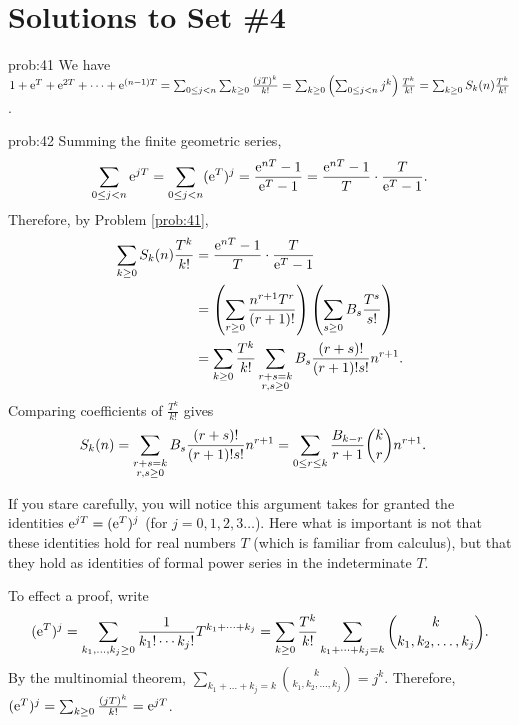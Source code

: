 
\chapter*{Solutions to Set \#4}
\label{set3sols}


\begin{sol}{prob:41} We have $1+\mathrm{e}^{T} + \mathrm{e}^{2T} + \dots + \mathrm{e}^{(n-1)T} = \sum_{0 \le j < n} \sum_{k\ge 0} \frac{(jT)^{k}}{k!} 
=\sum_{k\ge 0} \left(\sum_{0 \le j < n} j^k\right) \frac{T^k}{k!} = \sum_{k\ge 0} S_k(n) \frac{T^k}{k!}$.
\end{sol}

\begin{sol}{prob:42} Summing the finite geometric series,
\[ \sum_{0 \le j < n} \mathrm{e}^{jT} = \sum_{0 \le j < n} (\mathrm{e}^{T})^{j} = \frac{\mathrm{e}^{nT}-1}{\mathrm{e}^{T}-1} = \frac{\mathrm{e}^{nT}-1}{T} \cdot \frac{T}{\mathrm{e}^{T}-1}.\]
Therefore, by Problem \ref{prob:41},
\begin{align*} \sum_{k \ge 0} S_k(n) \frac{T^k}{k!} &= \frac{\mathrm{e}^{nT}-1}{T} \cdot \frac{T}{\mathrm{e}^{T}-1}\\
&= \left(\sum_{r \ge 0} \frac{n^{r+1} T^{r}}{(r+1)!}\right) \left(\sum_{s\ge 0} B_s \frac{T^s}{s!}\right) \\
&= \sum_{k\ge 0} \frac{T^k}{k!} \sum_{\substack{r+s=k \\ r,s\ge 0}} B_s \frac{(r+s)!}{(r+1)! s!} n^{r+1}.
\end{align*}
Comparing coefficients of $\frac{T^k}{k!}$ gives
\begin{align*} S_k(n) &= \sum_{\substack{r+s=k\\ r,s\ge 0}} B_s \frac{(r+s)!}{(r+1)! s!} n^{r+1} = \sum_{0 \le r \le k} \frac{B_{k-r}}{r+1} \binom{k}{r} n^{r+1}.\index{Bernoulli numbers!Faulhaber's formula}\index{Faulhaber's formula}\end{align*}

\begin{rmk} If you stare carefully, you will notice this argument takes for granted the identities $\mathrm{e}^{jT} = (\mathrm{e}^{T})^j$ (for $j=0,1,2,3\dots$). Here what is important is not that these identities hold for real numbers $T$ (which is familiar from calculus), but that they hold as identities of formal power series in the indeterminate $T$. 

To effect a proof, write \[ (\mathrm{e}^{T})^j = \sum_{k_1,\dots,k_j\ge 0} \frac{1}{k_1! \cdots k_j!} T^{k_1+\dots+k_j} = \sum_{k \ge 0} \frac{T^k}{k!} \sum_{k_1+\dots+k_j=k} \binom{k}{k_1,k_2,\dots,k_j}.\] By the multinomial theorem, $\sum_{k_1+\dots+k_j=k} \binom{k}{k_1,k_2,\dots,k_j}= j^k$. Therefore, $(\mathrm{e}^{T})^j = \sum_{k \ge 0} \frac{(jT)^k}{k!} = \mathrm{e}^{jT}$. 


\end{rmk}
\end{sol}
